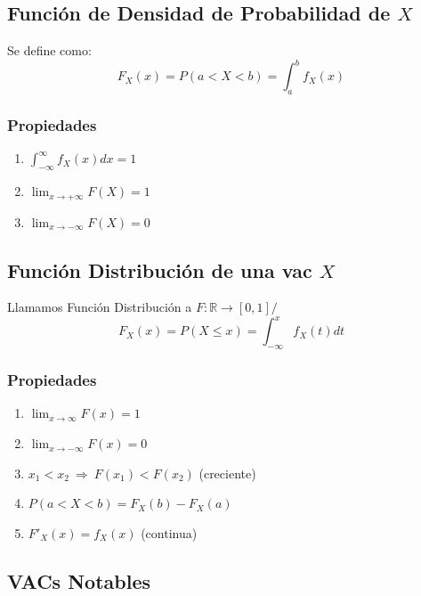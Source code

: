 \documentclass{article}
\newcommand{\tq}{/\,}                                   %
\newcommand{\reales}{\mathbb{R}}                        %
\newcommand{\Rightarrows}{\: \Rightarrow \:}            %
\begin{document}
\subsection{Función de Densidad de Probabilidad de $X$}
Se define como:
\begin{equation*}
    F_X(x) = P(a < X < b) = \int_a^b f_X(x)
\end{equation*}

\subsubsection*{Propiedades}
\begin{enumerate}
    \item $\int^\infty_{-\infty} f_X(x) dx = 1$
    \item $\lim_{x \rightarrow +\infty} F(X) = 1$
    \item $\lim_{x \rightarrow -\infty} F(X) = 0$
\end{enumerate}

\subsection{Función Distribución de una vac $X$}
Llamamos Función Distribución a $F: \reales \rightarrow [0,1] \tq$
\begin{equation*}
    F_X(x) = P(X \leq x) = \int_{-\infty}^x f_X(t) dt
\end{equation*}
\subsubsection*{Propiedades}
\begin{enumerate}
    \item $\lim_{x \rightarrow \infty} F(x) = 1$
    \item $\lim_{x \rightarrow -\infty} F(x) = 0$
    \item $x_1 < x_2 \Rightarrows F(x_1) < F(x_2)$ (creciente)
    \item $P(a < X < b) = F_X(b) - F_X(a)$
    \item $F'_X(x) = f_X(x)$ (continua)
\end{enumerate}



\subsection{VACs Notables}
\end{document}
